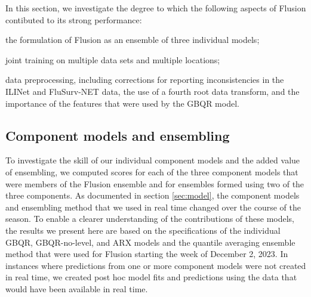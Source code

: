 \documentclass{article}\usepackage[]{graphicx}\usepackage[]{xcolor}
\begin{document}
In this section, we investigate the degree to which the following aspects of Flusion contibuted to its strong performance:
\begin{enumerate*}
\item the formulation of Flusion as an ensemble of three individual models;
\item joint training on multiple data sets and multiple locations;
\item data preprocessing, including corrections for reporting inconsistencies in the ILINet and FluSurv-NET data, the use of a fourth root data transform, and the importance of the features that were used by the GBQR model.
\end{enumerate*}

\subsection{Component models and ensembling}

To investigate the skill of our individual component models and the added value of ensembling, we computed scores for each of the three component models that were members of the Flusion ensemble and for ensembles formed using two of the three components.  As documented in section \ref{sec:model}, the component models and ensembling method that we used in real time changed over the course of the season. To enable a clearer understanding of the contributions of these models, the results we present here are based on the specifications of the individual GBQR, GBQR-no-level, and ARX models and the quantile averaging ensemble method that were used for Flusion starting the week of December 2, 2023.  In instances where predictions from one or more component models were not created in real time, we created post hoc model fits and predictions using the data that would have been available in real time.
\end{document}
